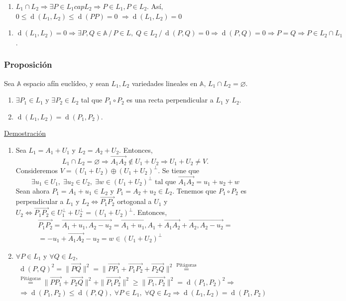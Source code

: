 \documentclass[12pt, a4paper, ones, notitlepage, openany,titlepage]{article}
\newcommand{\dobleimplicacion}[2]{
	\begin{enumerate}[label=$\Rightarrow/$]
		\item #1
	\end{enumerate}
	\begin{enumerate}[label=$\Leftarrow/$]
		\item #2
	\end{enumerate}
}
\newcommand{\demostracion}{\noindent\underline{Demostración}}
\newcommand{\distancia}[1]{\operatorname{d}(#1)}
\begin{document}
\dobleimplicacion{
$L_1 \cap L_2 \Longrightarrow \exists P \in L_1 cap L_2 \Longrightarrow P \in L_1, P \in L_2$. Así, $0 \le \distancia{L_1, L_2} \le \distancia{PP} = 0$ $\Longrightarrow \distancia{L_1,L_2} = 0$
}{
$\distancia{L_1, L_2} = 0 \Longrightarrow \exists P,Q \in \mathbb{A} \,/\, P \in L, \; Q \in L_2 \,/\, \distancia{P,Q} = 0 \Longrightarrow \distancia{P,Q} = 0 \Longrightarrow P = Q \Longrightarrow P \in L_2 \cap L_1$.
}

\subsubsection{Proposición}
Sea $\mathbb{A}$ espacio afín euclídeo, y sean $L_1, L_2$ variedades lineales en $\mathbb{A}$, $L_1 \cap L_2 = \varnothing$.
\begin{enumerate}[label=(\arabic*)]
	\item $\exists P_1 \in L_1$ y $\exists P_2 \in L_2$ tal que $P_1 \circ P_2$ es una recta perpendicular a $L_1$ y $L_2$.
	\item $\distancia{L_1,L_2} = \distancia{P_1,P_2}$.
\end{enumerate}
\demostracion

\begin{enumerate}[label=(\arabic*)]
	\item Sea $L_1 = A_1 + U_1$ y $L_2 = A_2 + U_2$. Entonces,
	$$
	L_1 \cap L_2 = \varnothing \Longrightarrow \overrightarrow{A_1 A_2} \notin U_1 + U_2 \Longrightarrow U_1 + U_2 \neq V.
	$$
	Consideremos $V = (U_1 + U_2) \oplus (U_1 + U_2)^\perp$. Se tiene que
	$$
	\exists u_1 \in U_1, \; \exists u_2 \in U_2, \; \exists w \in (U_1 + U_2)^\perp \text{ tal que } \overrightarrow{A_1 A_2} = u_1 + u_2 + w
	$$
	Sean ahora $P_1 = A_1 + u_1 \in L_2$ y $P_1 = A_2 + u_2 \in L_2$. Tenemos que $P_1 \circ P_2$ es perpendicular a $L_1$ y $L_2 \Longleftrightarrow \overrightarrow{P_1 P_2}$ ortogonal a $U_1$ y $U_2 \Longleftrightarrow \overrightarrow{P_1 P_2} \in U_1^\perp + U_2^\perp = (U_1 + U_2)^\perp$. Entonces,
	\begin{gather*}
	\overrightarrow{P_1 P_2} = \overrightarrow{A_1 + u_1 , A_2 - u_2} = \overrightarrow{A_1 + u_1, A_1} + \overrightarrow{A_1 A_2} + \overrightarrow{A_2, A_2 - u_2} = \\
	= -u_1 + \overrightarrow{A_1 A_2} - u_2 = w \in (U_1 + U_2)^\perp
	\end{gather*}

	\item $\forall P \in L_1$ y $\forall Q \in L_2$,
	\begin{gather*}
	\distancia{P, Q}^2 = \|\overrightarrow{PQ}\|^2 = \| \overrightarrow{PP_1} + \overrightarrow{P_1 P_2} + \overrightarrow{P_2 Q} \|^2 \stackrel{\text{Pitágoras}}{=} \\
	\stackrel{\text{Pitágoras}}{=} \| \overrightarrow{PP_1} + \overrightarrow{P_2 Q}\|^2 + \|\overrightarrow{P_1 P_2}\|^2 \ge \|\overrightarrow{P_1,P_2}\|^2 = \distancia{P_1,P_2}^2 \Longrightarrow \\ \Longrightarrow \distancia{P_1,P_2} \le \distancia{P,Q}, \; \forall P \in L_1, \; \forall Q \in L_2
	\Longrightarrow \distancia{L_1, L_2} = \distancia{P_1, P_2}
	\end{gather*}
\end{enumerate}
\end{document}
